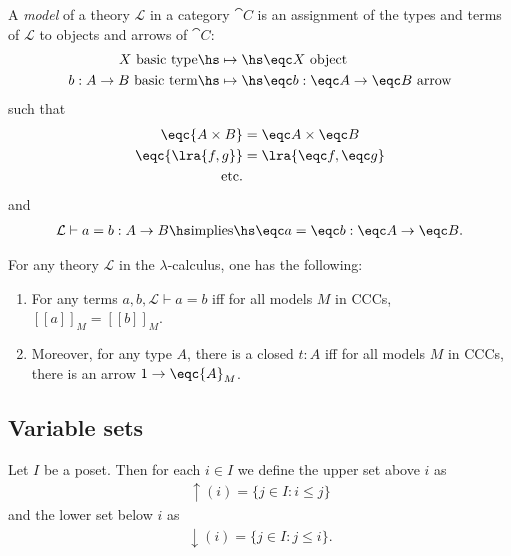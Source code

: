 \documentclass{article}
\begin{document}
\begin{definition}[Awodey p. 138]
    A \emph{model} of a theory $\mathcal{L}$ in a category $\cat C$
    is an assignment of the types and terms of $\mathcal{L}$ to objects
    and arrows of $\cat C$:
    \begin{align*}
        X\text{ basic type} \hs
        &\mapsto\hs\eqc X \text{ object} \\
        b:A\to B\text{ basic term} \hs
        &\mapsto\hs \eqc b: \eqc A \to \eqc B\text{ arrow}
    \end{align*}
    such that 
    \begin{align*}
        \eqc{A\times B} &= \eqc A \times \eqc B \\
        \eqc{\lra{f,g}} &= \lra{\eqc f, \eqc g}\\
        \text{etc.}
    \end{align*}
    and
    \begin{align*}
        \mathcal{L}\vdash a = b : A \to B \hs\text{implies}\hs
        \eqc a = \eqc b : \eqc A \to \eqc B.
    \end{align*}
\end{definition}

\begin{proposition}[Awodey p. 139]
    For any theory $\mathcal{L}$ in the $\lambda$-calculus, one has the
    following:
    \begin{enumerate}
        \item For any terms $a,b,\mathcal{L}\vdash a = b$ iff
            for all models $M$ in CCCs, $[\![a]\!]_M=[\![b]\!]_M$.
        \item Moreover, for any type $A$, there is a closed $t:A$ iff for all models $M$ in CCCs, there is an arrow $1\to\eqc{A}_M$. 
    \end{enumerate}
\end{proposition}

\subsection{Variable sets}

\begin{definition}
    Let $I$ be a poset. Then for each $i\in I$ we define 
    the upper set above $i$ as
    \begin{align*}
        \uparrow(i) = \{j\in I : i\leq j\}
    \end{align*}
    and the lower set below $i$ as
    \begin{align*}
        \downarrow(i) = \{j\in I : j\leq i\}.
    \end{align*}
\end{definition}
\end{document}
